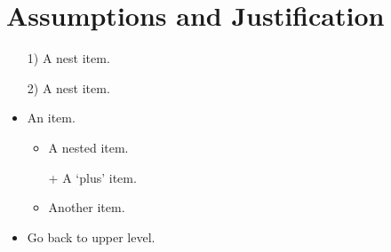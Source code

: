 \section{Assumptions and Justification}
\begin{enumerate}
	\item[1)] A nest item.
	\item[2)] A nest item.
\end{enumerate}

\begin{itemize} 
	\item An item. 
	\begin{itemize} 
		\item A nested item. 
		\item[+] A ‘plus’ item. 
		\item Another item. 
	\end{itemize} 
	\item Go back to upper level. 
\end{itemize}

